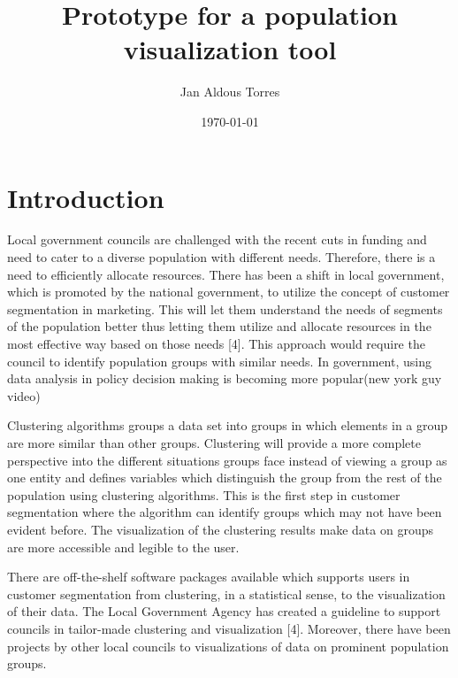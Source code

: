 \documentclass[11pt]{informatics-report}
\title{Prototype for a population visualization tool}
\author{Jan Aldous Torres}
\date{\today}
\begin{document}
\createFrontMatter
\onehalfspacing
\tableofcontents
\listoffigures
\doublespacing


\chapter{Introduction}
\cite{_developing_classification}
\cite{kent_midway}
\cite{boden_detecting_2013}
\cite{conway_data_2014}
\cite{customer_segmentaion}
\cite{graves_visualization_2013}
\cite{smart_cities}
\cite{acorn_user_guide}
\cite{gogolou_data_2016}
\cite{lga_guide}
\cite{experian}

Local government councils are challenged with the recent cuts in funding and need to cater to a diverse population with different needs. Therefore, there is a need to efficiently allocate resources. There has been a shift in local government, which is promoted by the national government, to utilize the concept of customer segmentation in marketing. This will let them understand the needs of segments of the population better thus letting them utilize and allocate resources in the most effective way based on those needs [4]. This approach would require the council to identify population groups with similar needs. In government, using data analysis in policy decision making is becoming more popular(new york guy video)\par

Clustering algorithms groups a data set into groups in which elements in a group are more similar than other groups. Clustering will provide a more complete perspective into the different situations groups face instead of viewing a group as one entity and defines variables which distinguish the group from the rest of the population using clustering algorithms. This is the first step in customer segmentation where the algorithm can identify groups which may not have been evident before. The visualization of the clustering results make data on groups are more accessible and legible to the user.\par

There are off-the-shelf software packages available which supports users in customer segmentation from clustering, in a statistical sense, to the visualization of their data. The Local Government Agency has created a guideline to support councils in tailor-made clustering and visualization [4]. Moreover, there have been projects by other local councils to visualizations of data on prominent population groups. \par
\end{document}

